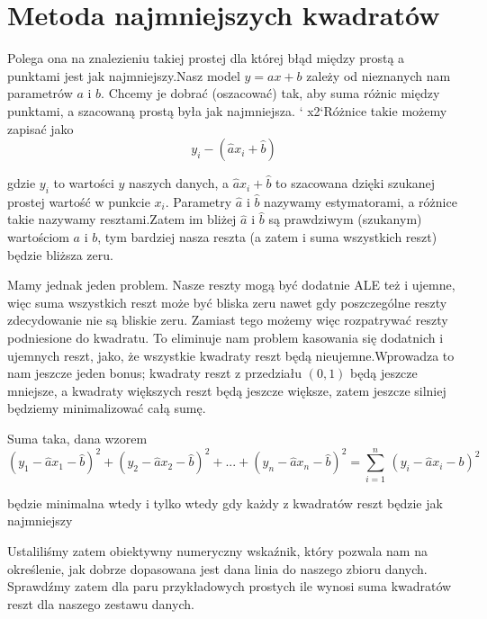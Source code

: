 \documentclass[a4paper,12pt]{article}
\begin{document}
\section{Metoda najmniejszych kwadratów}
Polega ona na znalezieniu takiej prostej dla której błąd między prostą a punktami jest jak najmniejszy.Nasz model $y=ax+b$ zależy od nieznanych nam parametrów $a$ i $b$. Chcemy je dobrać (oszacować) tak, aby suma różnic między punktami, a szacowaną prostą była jak najmniejsza. ` x2`Różnice takie możemy zapisać jako
\[
	y_i - (\hat a x_i + \hat b)
\]

gdzie $y_i$ to wartości $y$ naszych danych, a $\hat a x_i + \hat b$ to szacowana dzięki szukanej prostej wartość w punkcie $x_i$. Parametry $\hat a$ i $\hat b$ nazywamy estymatorami, a różnice takie nazywamy resztami.Zatem im bliżej $\hat a$ i $\hat b$ są prawdziwym (szukanym) wartościom $a$ i $b$, tym bardziej nasza reszta (a zatem i suma wszystkich reszt) będzie bliższa zeru.

Mamy jednak jeden problem. Nasze reszty mogą być dodatnie ALE też i ujemne, więc suma wszystkich reszt może być bliska zeru nawet gdy poszczególne reszty zdecydowanie nie są bliskie zeru. Zamiast tego możemy więc rozpatrywać reszty podniesione do kwadratu. To eliminuje nam problem kasowania się dodatnich i ujemnych reszt, jako, że wszystkie kwadraty reszt będą nieujemne.Wprowadza to nam jeszcze jeden bonus; kwadraty reszt z przedziału $(0,1)$ będą jeszcze mniejsze, a kwadraty większych reszt będą jeszcze większe, zatem jeszcze silniej będziemy minimalizować całą sumę.

Suma taka, dana wzorem
\[
	(y_1 - \hat a x_1 - \hat b)^2 + (y_2 - \hat a x_2 - \hat b)^2 + ... + (y_n - \hat a x_n - \hat b)^2 = \sum_{i=1}^n\,(y_i - \hat a x_i - b)^2
\]

będzie minimalna wtedy i tylko wtedy gdy każdy z kwadratów reszt będzie jak najmniejszy

Ustaliliśmy zatem obiektywny numeryczny wskaźnik, który pozwala nam na określenie, jak dobrze dopasowana jest dana linia do naszego zbioru danych. Sprawdźmy zatem dla paru przykładowych prostych ile wynosi suma kwadratów reszt dla naszego zestawu danych.
\end{document}
